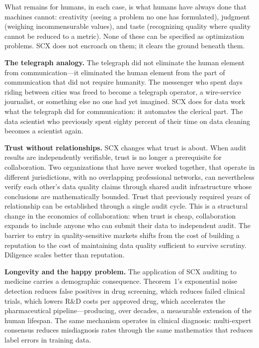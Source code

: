 \documentclass[twocolumn]{article}
\theoremstyle{definition}
\begin{document}
What remains for humans, in each case, is what humans have always done that machines cannot: creativity (seeing a problem no one has formulated), judgment (weighing incommensurable values), and taste (recognizing quality where quality cannot be reduced to a metric). None of these can be specified as optimization problems. SCX does not encroach on them; it clears the ground beneath them.

\textbf{The telegraph analogy.} The telegraph did not eliminate the human element from communication---it eliminated the human element from the part of communication that did not require humanity. The messenger who spent days riding between cities was freed to become a telegraph operator, a wire-service journalist, or something else no one had yet imagined. SCX does for data work what the telegraph did for communication: it automates the clerical part. The data scientist who previously spent eighty percent of their time on data cleaning becomes a scientist again.

\textbf{Trust without relationships.} SCX changes what trust is about. When audit results are independently verifiable, trust is no longer a prerequisite for collaboration. Two organizations that have never worked together, that operate in different jurisdictions, with no overlapping professional networks, can nevertheless verify each other's data quality claims through shared audit infrastructure whose conclusions are mathematically bounded. Trust that previously required years of relationship can be established through a single audit cycle. This is a structural change in the economics of collaboration: when trust is cheap, collaboration expands to include anyone who can submit their data to independent audit. The barrier to entry in quality-sensitive markets shifts from the cost of building a reputation to the cost of maintaining data quality sufficient to survive scrutiny. Diligence scales better than reputation.

\textbf{Longevity and the happy problem.} The application of SCX auditing to medicine carries a demographic consequence. Theorem~1's exponential noise detection reduces false positives in drug screening, which reduces failed clinical trials, which lowers R\&D costs per approved drug, which accelerates the pharmaceutical pipeline---producing, over decades, a measurable extension of the human lifespan. The same mechanism operates in clinical diagnosis: multi-expert consensus reduces misdiagnosis rates through the same mathematics that reduces label errors in training data.
\end{document}
